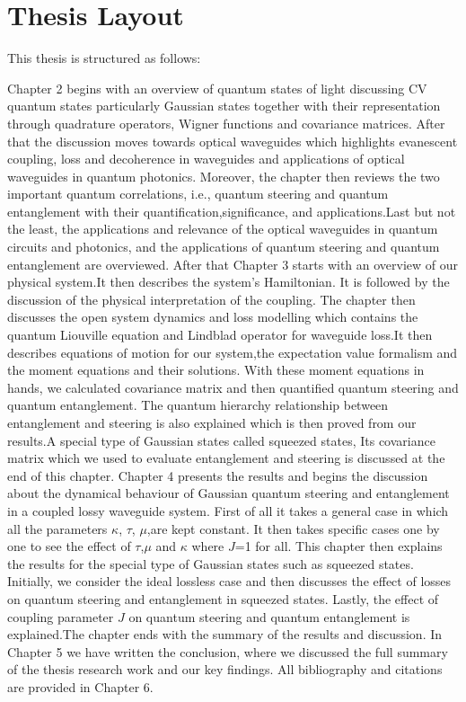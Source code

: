 \section{Thesis Layout}
This thesis is structured as follows:

Chapter 2 begins with an overview of quantum states of light discussing CV quantum states particularly Gaussian states together with their representation through quadrature operators, Wigner functions and covariance matrices. After that the discussion moves towards optical waveguides which highlights evanescent coupling, loss and decoherence in waveguides and applications of optical waveguides in quantum photonics. Moreover, the chapter then reviews the two  important quantum correlations, i.e., quantum steering and quantum entanglement with their quantification,significance, and applications.Last but not the least, the applications and relevance of the optical waveguides in quantum circuits and photonics, and  the applications of  quantum steering and quantum entanglement are overviewed.
After that Chapter 3 starts with an overview of our physical system.It then describes the system's Hamiltonian. It is followed by the discussion of the physical interpretation of the coupling. The chapter then discusses the open system dynamics and loss modelling which contains the quantum Liouville equation and Lindblad operator for waveguide loss.It then describes equations of motion for our system,the expectation value formalism and the moment equations and their solutions. With these moment equations in hands, we calculated covariance matrix and then quantified quantum steering and quantum entanglement. The quantum hierarchy relationship between entanglement and steering is also explained which is then proved from our results.A special type of Gaussian states called squeezed states, Its covariance matrix which we used to evaluate entanglement and steering is discussed at the end of this chapter.
Chapter 4 presents the results and begins the discussion about the dynamical behaviour of Gaussian quantum steering and entanglement in a coupled lossy waveguide system. First of all it takes a general case in which all the parameters $\kappa$, $\tau$, $\mu$,are kept constant. It then takes specific cases one by one to see the effect of  $\tau$,$\mu$ and $\kappa$ where $J$=1 for all. This chapter then explains the results for the special type of Gaussian states such as squeezed states. Initially, we consider the ideal lossless case and then discusses the effect of losses on quantum steering and entanglement in squeezed states. Lastly, the effect of coupling parameter $J$ on quantum steering and quantum entanglement is explained.The chapter ends with the summary of the results and discussion.
In Chapter 5 we have written the conclusion, where we discussed the full summary of the thesis research work and our key findings.
All bibliography and citations are provided in Chapter 6.